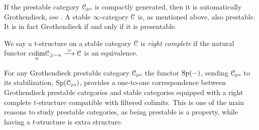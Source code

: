 

\begin{remark}
    \label{ch4:rm:stable-is-grothendieck-prestable}
    If the prestable category $\EuScript{C}_{\hspace{-1pt}\scriptscriptstyle\geqslant 0}$ is compactly generated, then it is automatically Grothendieck, see \cite[C.1.4.4]{lurie_SAG}. A stable $\infty$-category $\EuScript{C}$ is, as mentioned above, also prestable. It is in fact Grothendieck if and only if it is presentable. 
\end{remark}

\begin{definition}
    We say a $t$-structure on a stable category $\EuScript{C}$ is \emph{right complete} if the natural functor $\displaystyle {\underset{n}{\operatorname{colim}}} \EuScript{C}_{\geqslant -n} \overset{\simeq}{\longrightarrow} \EuScript{C} $ is an equivalence. 
\end{definition}

\begin{remark}
    \label{ch4:rm:grothendieck-iff-right-complete-and-colims}
    For any Grothendieck prestable category $\EuScript{C}_{\hspace{-1pt}\scriptscriptstyle\geqslant 0}$ the functor $\mathrm{Sp}(-)$, sending $\EuScript{C}_{\hspace{-1pt}\scriptscriptstyle\geqslant 0}$ to its stabilization, $\mathrm{Sp}(\EuScript{C}_{\hspace{-1pt}\scriptscriptstyle\geqslant 0})$, provides a one-to-one correspondence between Grothendieck prestable categories and stable categories equipped with a right complete $t$-structure compatible with filtered colimits. This is one of the main reasons to study prestable categories, as being prestable is a property, while having a $t$-structure is extra structure. 
\end{remark}

